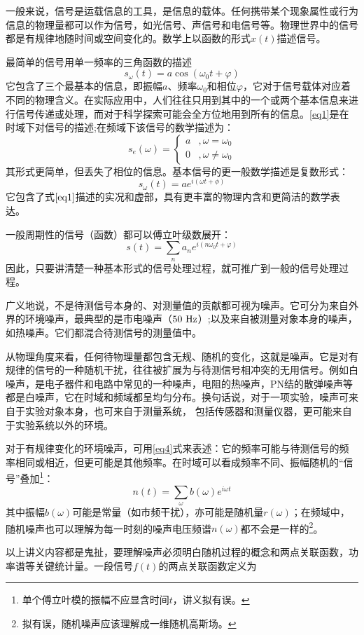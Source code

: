 \documentclass[11pt,a4paper]{ctexart}
\newcommand{\red}{\color{red}}
\newcommand{\beq}{\begin{equation}}
\newcommand{\eeq}{\end{equation}}
\newcommand{\unit}[1]{\rm \ #1}
\begin{document}
一般来说，信号是运载信息的工具，是信息的载体。任何携带某个现象属性或行为信息的物理量都可以作为信号，如光信号、声信号和电信号等。物理世界中的信号都是有规律地随时间或空间变化的。数学上以函数的形式$x(t)$描述信号。
\par
最简单的信号用单一频率的三角函数的描述
\beq \label{eq1}
s_\omega (t) = a \cos (\omega_0 t + \varphi) 
\eeq
它包含了三个最基本的信息，即振幅$a$、频率$\omega_0$和相位$\varphi$，它对于信号载体对应着不同的物理含义。在实际应用中，人们往往只用到其中的一个或两个基本信息来进行信号传递或处理，而对于科学探索可能会全方位地用到所有的信息。\cref{eq1}是在时域下对信号的描述;在频域下该信号的数学描述为：
\beq
s_e(\omega) = \begin{cases}
a &, \omega = \omega_0 \\
0 &, \omega \not= \omega_0
\end{cases}
\eeq
其形式更简单，但丢失了相位的信息。基本信号的更一般数学描述是复数形式：
\beq
s_\omega (t) = ae^{i (\omega t + \phi)}
\eeq
它包含了式$\cref{eq1}$描述的实况和虚部，具有更丰富的物理内含和更简洁的数学表达。
\par
一般周期性的信号（函数）都可以傅立叶级数展开：
\beq \label{eq4}
s(t) = \sum_n a_n e^{i(n \omega_0 t + \varphi)}
\eeq
因此，只要讲清楚一种基本形式的信号处理过程，就可推广到一般的信号处理过程。
\par
广义地说，不是待测信号本身的、对测量值的贡献都可视为噪声。它可分为来自外界的环境噪声，最典型的是市电噪声（$50\unit{Hz}$）;以及来自被测量对象本身的噪声，如热噪声。它们都混合待测信号的测量值中。
\par
从物理角度来看，任何待物理量都包含无规、随机的变化，这就是噪声。它是对有规律的信号的一种随机干扰，往往被扩展为与待测信号相冲突的无用信号。例如白噪声，是电子器件和电路中常见的一种噪声，电阻的热噪声，PN结的散弹噪声等都是白噪声，它在时域和频域都呈均匀分布。换句话说，{\red 对于一项实验，噪声可来自于实验对象本身，也可来自于测量系统， 包括传感器和测量仪器，更可能来自于实验系统以外的环境}。
\par
对于有规律变化的环境噪声，可用\cref{eq4}式来表述：它的频率可能与待测信号的频率相同或相近，但更可能是其他频率。在时域可以看成频率不同、振幅随机的“信号”叠加\footnote{单个傅立叶模的振幅不应显含时间$t$，讲义拟有误。}：
\beq
n(t) = \sum_\omega b(\omega) e^{i\omega t}
\eeq
其中振幅$b(\omega)$可能是常量（如市频干扰），亦可能是随机量$r(\omega)$；在频域中，随机噪声也可以理解为每一时刻的噪声电压频谱$n(\omega) $都不会是一样的\footnote{拟有误，随机噪声应该理解成一维随机高斯场。}。
\par
以上讲义内容都是鬼扯，要理解噪声必须明白随机过程的概念和两点关联函数，功率谱等关键统计量。一段信号$f(t)$的两点关联函数\cite{prob}定义为
\end{document}

